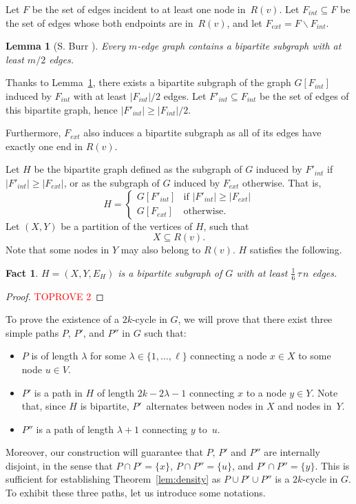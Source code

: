 \documentclass{article}
\newcommand{\bp}{X}
\newcommand{\tp}{Y}
\newtheorem{lemma}{Lemma}
\newtheorem{fact}{Fact}
\begin{document}
Let $F$ be the set of edges incident to at least one node in~$R(v)$. Let $F_{int}\subseteq F$ be the set of edges whose both endpoints are in~$R(v)$, and let $F_{ext}=F\smallsetminus F_{int}$.   

\begin{lemma}[S. Burr \cite{burr1982}]\label{lem:de-Burr}
Every $m$-edge graph contains a bipartite subgraph with at least $m/2$ edges.
\end{lemma}

Thanks to Lemma~\ref{lem:de-Burr}, there exists a bipartite subgraph of the graph $G[F_{int}]$ induced by $F_{int}$ with at least $|F_{int}|/2$ edges. Let $F'_{int}\subseteq F_{int}$ be the set of edges of this bipartite graph, hence $|F'_{int}|\geq |F_{int}|/2$.

Furthermore, $F_{ext}$ also induces a bipartite subgraph as all of its edges have exactly one end in $R(v)$.

Let $H$ be the bipartite graph defined as the subgraph of $G$ induced by $F'_{int}$ if $|F'_{int}|\geq |F_{ext}|$, or as the subgraph of $G$ induced by $F_{ext}$ otherwise. That is, 
\[
H=\left\{\begin{array}{ll}
G[F'_{int}] & \mbox{if $|F'_{int}|\geq |F_{ext}|$} \\
G[F_{ext}] & \mbox{otherwise.}
\end{array}\right.
\]
Let $(\bp,\tp)$ be a partition of the vertices of $H$, such that \[\bp\subseteq R(v).\] Note that some nodes in $\tp$ may also belong to $R(v)$. $H$ satisfies the following.

\begin{fact}\label{fact:size_edges}
$H=(\bp,\tp,E_H)$ is a bipartite subgraph of $G$ with at least $\frac16\, \tau\, n$ edges.
\end{fact}

\begin{proof}\textcolor{red}{TOPROVE 2}\end{proof}



To prove the existence of a $2k$-cycle in $G$, we will prove that there exist three simple paths $P$, $P'$, and $P''$ in $G$ such that:
\begin{itemize}
    \item $P$ is of length $\lambda$ for some  $\lambda\in\{1,\dots,\ell\}$ connecting a node $x\in \bp$ to some node $u\in V$.
    \item $P'$ is a path in $H$ of length $2k-2\lambda-1$ connecting $x$  to a node $y\in \tp$. Note that, since $H$ is bipartite, $P'$~alternates between nodes in $\bp$ and nodes in~$\tp$. 
    \item $P''$ is a path of length $\lambda+1$ connecting $y$ to~$u$.
\end{itemize}
Moreover, our construction will guarantee that $P$, $P'$ and $P''$ are internally disjoint, in the sense that $P\cap P'=\{x\}$, $P\cap P''=\{u\}$, and $P'\cap P''=\{y\}$. This is sufficient for establishing Theorem~\ref{lem:density} as $P\cup P'\cup P''$ is a $2k$-cycle in $G$. To exhibit these three paths, let us introduce some notations. 
\end{document}
